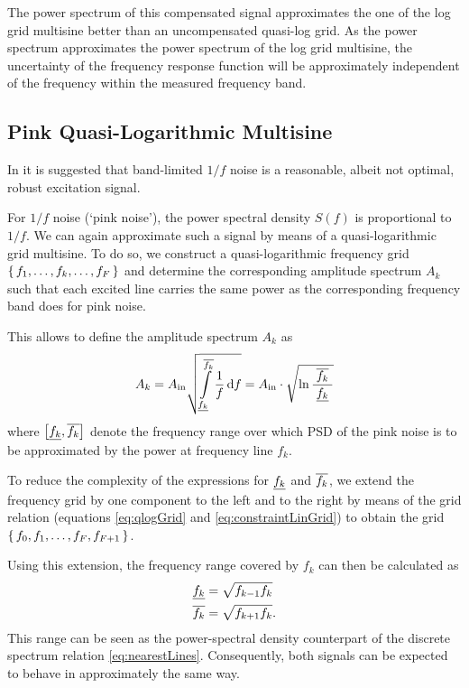   The power spectrum of this compensated signal approximates the one of the log grid multisine better than an uncompensated quasi-log grid.
  As the power spectrum approximates the power spectrum of the log grid multisine, the uncertainty of the frequency response function will be approximately independent of the frequency within the measured frequency band.

  \subsection{Pink Quasi-Logarithmic Multisine}
  In \citep{Rojas2007} it is suggested that band-limited $1/f$ noise is a reasonable, albeit not optimal, robust excitation signal.

  For $1/f$ noise (`pink noise'), the power spectral density $S(f)$ is proportional to $1/f$.
  We can again approximate such a signal by means of a quasi-logarithmic grid multisine.
  To do so, we construct a quasi-logarithmic frequency grid $\set{f_1,\ldots,f_k,\ldots,f_F}$ and determine the corresponding amplitude spectrum $A_k$ such that each excited line carries the same power as the corresponding frequency band does for pink noise.

  This allows to define the amplitude spectrum $A_k$ as
  \begin{equation}
    A_k = A_{\mathrm{in}}
                 \sqrt{\int_{\underline{f_{k}}}
                     ^{\overline{f_{k}}}
                     \limits
                     \frac{1}
                          {f}
                     \,\mathrm{d}{f}}
          = A_{\mathrm{in}}
                \cdot
                \sqrt{
                \ln \frac{\;\overline{f_{k}}\;}{\underline{f_{k}}}
                }
  \end{equation}
  where $\left[ \underline{f_{k}}, \overline{f_{k}} \right] $ denote the frequency range over which PSD of the pink noise is to be approximated by the power at frequency line $f_k$.

  To reduce the complexity of the expressions for $\underline{f_{k}}$ and $\overline{f_{k}}$, we extend the frequency grid by one component to the left and to the right by means of the grid relation (equations \eqref{eq:qlogGrid} and \eqref{eq:constraintLinGrid}) to obtain the grid $\set{f_0, f_1, \ldots, f_F, f_{F+1}}$.

  Using this extension, the frequency range covered by $f_k$ can then be calculated as
    \begin{align}
      \underline{f_{k}} &= \sqrt{f_{k-1} f_k}\\
      \overline{f_{k}} &= \sqrt{f_{k+1} f_k}
    \label{eq:fRange}
    \text{.}
    \end{align}
  This range can be seen as the power-spectral density counterpart of the discrete spectrum relation \eqref{eq:nearestLines}.
  Consequently, both signals can be expected to behave in approximately the same way.


